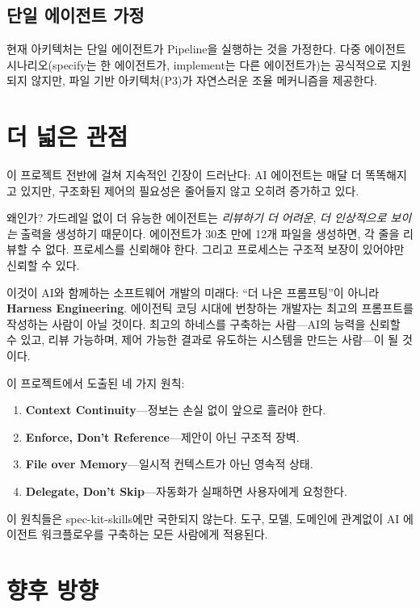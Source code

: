 \documentclass[11pt,a4paper,openright,twoside]{report}
\begin{document}
\subsection{단일 에이전트 가정}

현재 아키텍처는 단일 에이전트가 Pipeline을 실행하는 것을 가정한다. 다중 에이전트 시나리오(specify는 한 에이전트가, implement는 다른 에이전트가)는 공식적으로 지원되지 않지만, 파일 기반 아키텍처(P3)가 자연스러운 조율 메커니즘을 제공한다.

\section{더 넓은 관점}

이 프로젝트 전반에 걸쳐 지속적인 긴장이 드러난다: AI 에이전트는 매달 더 똑똑해지고 있지만, 구조화된 제어의 필요성은 줄어들지 않고 오히려 증가하고 있다.

왜인가? 가드레일 없이 더 유능한 에이전트는 \emph{리뷰하기 더 어려운}, \emph{더 인상적으로 보이는} 출력을 생성하기 때문이다. 에이전트가 30초 만에 12개 파일을 생성하면, 각 줄을 리뷰할 수 없다. 프로세스를 신뢰해야 한다. 그리고 프로세스는 구조적 보장이 있어야만 신뢰할 수 있다.

이것이 AI와 함께하는 소프트웨어 개발의 미래다: ``더 나은 프롬프팅''이 아니라 \textbf{Harness Engineering}. 에이전틱 코딩 시대에 번창하는 개발자는 최고의 프롬프트를 작성하는 사람이 아닐 것이다. 최고의 하네스를 구축하는 사람---AI의 능력을 신뢰할 수 있고, 리뷰 가능하며, 제어 가능한 결과로 유도하는 시스템을 만드는 사람---이 될 것이다.

이 프로젝트에서 도출된 네 가지 원칙:

\begin{enumerate}
  \item \textbf{Context Continuity}---정보는 손실 없이 앞으로 흘러야 한다.
  \item \textbf{Enforce, Don't Reference}---제안이 아닌 구조적 장벽.
  \item \textbf{File over Memory}---일시적 컨텍스트가 아닌 영속적 상태.
  \item \textbf{Delegate, Don't Skip}---자동화가 실패하면 사용자에게 요청한다.
\end{enumerate}

이 원칙들은 spec-kit-skills에만 국한되지 않는다. 도구, 모델, 도메인에 관계없이 AI 에이전트 워크플로우를 구축하는 모든 사람에게 적용된다.

\section{향후 방향}
\end{document}
